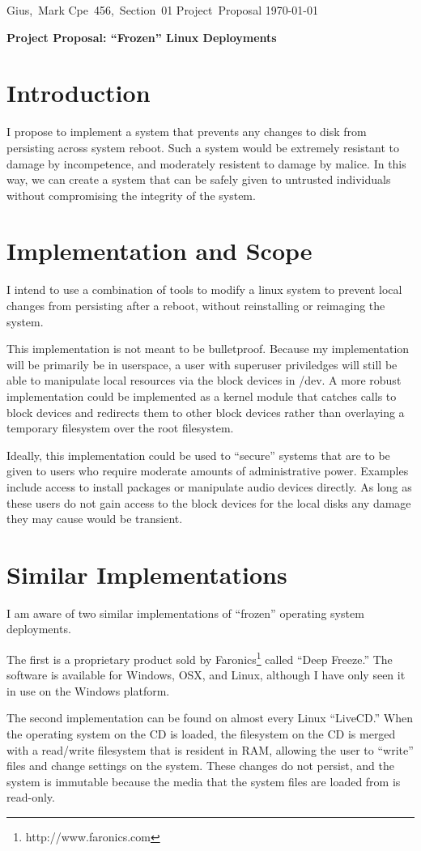\documentclass[11pt]{article}
\begin{document}
\hfill\vbox{\hbox{Gius, Mark}
            \hbox{Cpe 456, Section 01} 
            \hbox{Project Proposal}   
            \hbox{\today}}\par

\bigskip
\centerline{\Large\bf Project Proposal: ``Frozen'' Linux Deployments}\par
\bigskip

\section{Introduction}
I propose to implement a system that prevents any changes to disk from
persisting across system reboot. Such a system would be extremely resistant to
damage by incompetence, and moderately resistent to damage by malice.  In this
way, we can create a system that can be safely given to untrusted individuals
without compromising the integrity of the system.

\section{Implementation and Scope}
I intend to use a combination of tools to modify a linux system to prevent
local changes from persisting after a reboot, without reinstalling or
reimaging the system.

This implementation is not meant to be bulletproof.  Because my implementation
will be primarily be in userspace, a user with superuser priviledges will
still be able to manipulate local resources via the block devices in /dev. A
more robust implementation could be implemented as a kernel module that
catches calls to block devices and redirects them to other block devices rather 
than overlaying a temporary filesystem over the root filesystem.

Ideally, this implementation could be used to ``secure'' systems that are to
be given to users who require moderate amounts of administrative power.
Examples include access to install packages or manipulate audio devices
directly.  As long as these users do not gain access to the block devices for
the local disks any damage they may cause would be transient. 

\section{Similar Implementations}
I am aware of two similar implementations of ``frozen'' operating system 
deployments.  

The first is a proprietary product sold by 
Faronics\footnote{http://www.faronics.com} called ``Deep Freeze.'' The software is
available for Windows, OSX, and Linux, although I have only seen it in use on
the Windows platform. 

The second implementation can be found on almost every Linux ``LiveCD.'' When
the operating system on the CD is loaded, the filesystem on the CD is merged
with a read/write filesystem that is resident in RAM, allowing the user to
``write'' files and change settings on the system.  These changes do not
persist, and the system is immutable because the media that the system files
are loaded from is read-only.  
\end{document}
